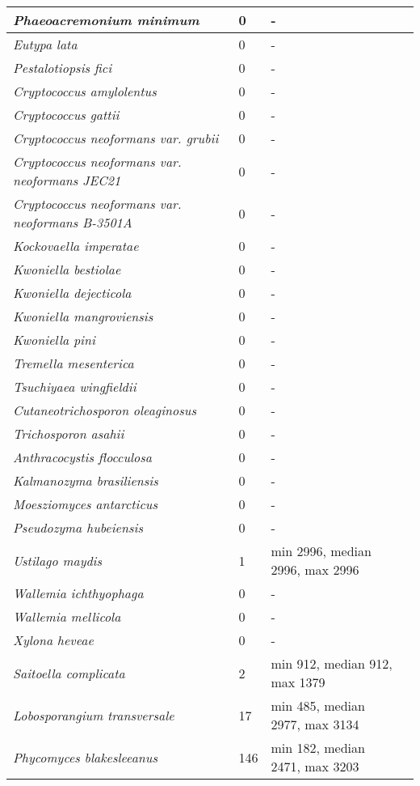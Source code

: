 {\begin{longtable}{| L{4cm} | L{2cm}  | L{5cm} | L{4cm} |}
\textit{Phaeoacremonium minimum} & 0 & - & \\ \hline
\textit{Eutypa lata} & 0 & - & \\ \hline
\textit{Pestalotiopsis fici} & 0 & - & \\ \hline
\textit{Cryptococcus amylolentus} & 0 & - & \\ \hline
\textit{Cryptococcus gattii} & 0 & - & \\ \hline
\textit{Cryptococcus neoformans var. grubii} & 0 & - & \\ \hline
\textit{Cryptococcus neoformans var. neoformans JEC21} & 0 & - & \\ \hline
\textit{Cryptococcus neoformans var. neoformans B-3501A} & 0 & - & \\ \hline
\textit{Kockovaella imperatae} & 0 & - & \\ \hline
\textit{Kwoniella bestiolae} & 0 & - & \\ \hline
\textit{Kwoniella dejecticola} & 0 & - & \\ \hline
\textit{Kwoniella mangroviensis} & 0 & - & \\ \hline
\textit{Kwoniella pini} & 0 & - & \\ \hline
\textit{Tremella mesenterica} & 0 &- & \\ \hline
\textit{Tsuchiyaea wingfieldii} & 0 & - & \\ \hline
\textit{Cutaneotrichosporon oleaginosus} & 0 & - & \\ \hline
\textit{Trichosporon asahii} & 0 & - & \\ \hline
\textit{Anthracocystis flocculosa} & 0 & - & \\ \hline
\textit{Kalmanozyma brasiliensis} & 0 & - & \\ \hline
\textit{Moesziomyces antarcticus} & 0 & -& \\ \hline
\textit{Pseudozyma hubeiensis} & 0 & - & \\ \hline
\textit{Ustilago maydis} & 1 & min 2996, median 2996, max 2996 & \\ \hline
\textit{Wallemia ichthyophaga} & 0 & - & \\ \hline
\textit{Wallemia mellicola} & 0 & - & \\ \hline
\textit{Xylona heveae} & 0 & - & \\ \hline
\textit{Saitoella complicata} & 2 & min 912, median 912, max 1379 & \\ \hline
\textit{Lobosporangium transversale} & 17 & min 485, median 2977, max 3134 & \\ \hline
\textit{Phycomyces blakesleeanus} & 146 & min 182, median 2471, max 3203 & \\ \hline

\end{longtable}}
